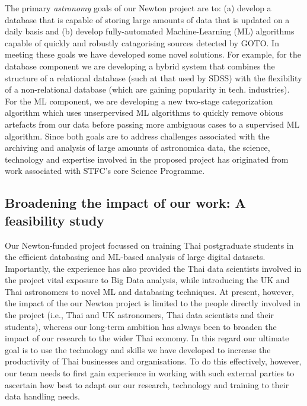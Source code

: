 \documentclass[11pt]{article}
\begin{document}
\vspace{2mm}
\noindent
The primary {\it astronomy} goals of our Newton project are to: (a) develop a database that is capable of storing large amounts of data that is updated on a daily basis and (b) develop fully-automated Machine-Learning (ML) algorithms capable of quickly and robustly catagorising sources detected by GOTO. In meeting these goals we have developed some novel solutions. For example, for the database component we are developing a hybrid system that combines the structure of a relational database (such at that used by SDSS) with the flexibility of a non-relational database (which are gaining popularity in tech. industries). For the ML component, we are developing a new two-stage categorization algorithm which uses unserpervised ML algorithms to quickly remove obious artefacts from our data before passing more ambiguous cases to a supervised ML algorithm. Since both goals are to address challenges associated with the archiving and analysis of large amounts of astronomica data, the science, technology and expertise involved in the proposed project has originated from work associated with STFC's core Science Programme. 

\subsection{Broadening the impact of our work: A feasibility study}
Our Newton-funded project focussed on training Thai postgraduate students in the efficient databasing and ML-based analysis of large digital datasets. Importantly, the experience has also provided the Thai data scientists involved in the project vital exposure to Big Data analysis, while introducing the UK and Thai astronomers to novel ML and databasing techniques. At present, however, the impact of the our Newton project is limited to the people directly involved in the project (i.e., Thai and UK astronomers, Thai data scientists and their students), whereas our long-term ambition has always been to broaden the impact of our research to the wider Thai economy. In this regard our ultimate goal is to use the technology and skills we have developed to increase the productivity of Thai businesses and organisations. To do this effectively, however, our team needs to first gain experience in working with such external parties to ascertain how best to adapt our our research, technology and training to their data handling needs.  
\end{document}
